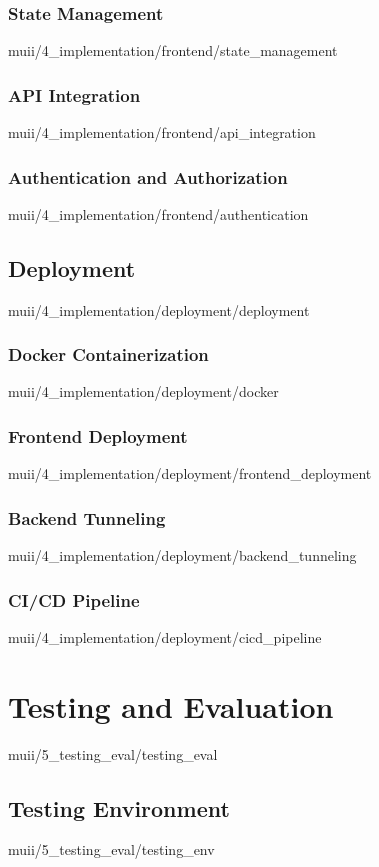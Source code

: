 \documentclass[english,epsbased,copyright,final,printable,covers,extendedindex,firstnumbered,tfm,gnuplot,loc,lof,lot]{tfgtfmthesisuam}
\begin{document}
      \subsection{State Management\label{SS:STATEMAN}}{muii/4_implementation/frontend/state_management}
      \subsection{API Integration\label{SS:APIINTEG}}{muii/4_implementation/frontend/api_integration}
      \subsection{Authentication and Authorization\label{SS:AUTH}}{muii/4_implementation/frontend/authentication}

    \section{Deployment\label{SEC:DEPLOYMENT}}{muii/4_implementation/deployment/deployment}
      \subsection{Docker Containerization\label{SS:DOCKER}}{muii/4_implementation/deployment/docker}
      \subsection{Frontend Deployment\label{SS:FRONTDEPLOY}}{muii/4_implementation/deployment/frontend_deployment}
      \subsection{Backend Tunneling\label{SS:BACKTUNNEL}}{muii/4_implementation/deployment/backend_tunneling}
      \subsection{CI/CD Pipeline\label{SS:CICD}}{muii/4_implementation/deployment/cicd_pipeline}

  \chapter{Testing and Evaluation\label{CAP:TESTEVAL}}{muii/5_testing_eval/testing_eval}
    \section{Testing Environment\label{SEC:TESTENV}}{muii/5_testing_eval/testing_env}    
\end{document}
